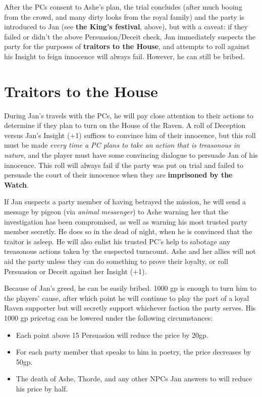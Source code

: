 \documentclass{report}
\theoremstyle{definition}
\begin{document}
After the PCs consent to Ashe's plan, the trial concludes (after much booing from the crowd, and many dirty looks from the royal family) and the party is introduced to Jan (see \textbf{the King's festival}, above), but with a caveat: if they failed or didn't the above Persuasion/Deceit check, Jan immediately suspects the party for the purposes of \textbf{traitors to the House}, and attempts to roll against his Insight to feign innocence will always fail. However, he can still be bribed. 

\section{Traitors to the House}
During Jan's travels with the PCs, he will pay close attention to their actions to determine if they plan to turn on the House of the Raven. A roll of Deception versus Jan's Insight (+1) suffices to convince him of their innocence, but this roll must be made \textit{every time a PC plans to take an action that is treasonous in nature}, and the player must have some convincing dialogue to persuade Jan of his innocence. This roll will always fail if the party was put on trial and failed to persuade the court of their innocence when they are \textbf{imprisoned by the Watch}.

If Jan suspects a party member of having betrayed the mission, he will send a message by pigeon (via \textit{animal messenger}) to Ashe warning her that the investigation has been compromised, as well as warning his most trusted party member secretly. He does so in the dead of night, when he is convinced that the traitor is asleep. He will also enlist his trusted PC's help to sabotage any treasonous actions taken by the suspected turncount. Ashe and her allies will not aid the party unless they can do something to prove their loyalty, or roll Persuasion or Deceit against her Insight (+1).

Because of Jan's greed, he can be easily bribed. 1000 gp is enough to turn him to the players' cause, after which point he will continue to play the part of a loyal Raven supporter but will secretly support whichever faction the party serves. His 1000 gp pricetag can be lowered under the following circumstances:

\begin{itemize}
\item Each point above 15 Persuasion will reduce the price by 20gp.
\item For each party member that speaks to him in poetry, the price decreases by 50gp.
\item The death of Ashe, Thorde, and any other NPCs Jan answers to will reduce his price by half.
\end{itemize}
\end{document}
